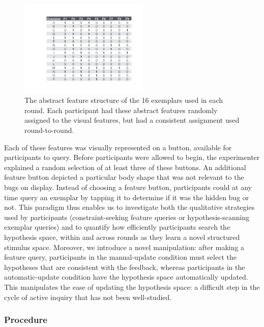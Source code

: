 \documentclass[man,floatsintext]{apa6}
\begin{document}
\begin{figure}[h]
  \centering
  \includegraphics[width=0.55\textwidth]{figures/feature_table}
  \caption{The abstract feature structure of the 16 exemplars used in each round. 
Each participant had these abstract features randomly assigned to the visual 
features, but had a consistent assignment used round-to-round.}
  \label{fig:feature_table}
\end{figure} 

Each of these features was visually represented on a button, available for participants to query. Before 
participants were allowed to begin, the experimenter explained a random selection of at least three of these buttons. 
An additional feature button depicted a particular body shape that was not relevant to the bugs on display. 
Instead of choosing a feature button, participants could at any time query an exemplar by tapping it to determine if it was the hidden bug or not. This paradigm thus enables us to investigate both the qualitative strategies used by participants (constraint-seeking feature queries or hypothesis-scanning exemplar queries) and to quantify how efficiently participants search the hypothesis space, within and across rounds as they learn a novel structured stimulus space. Moreover, we introduce a novel manipulation: after making a feature query, participants in the manual-update condition must select the hypotheses that are consistent with the feedback, whereas participants in the automatic-update condition have the hypothesis space automatically updated. This manipulates the ease of updating the hypothesis space: a difficult step in the cycle of active inquiry that has not been well-studied. 

\subsubsection{Procedure}
\end{document}
